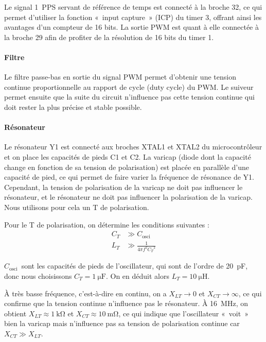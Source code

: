 \documentclass[12pt, a4paper, titlepage]{article}
\newcommand{\LT}{\ensuremath{L_T}}
\newcommand{\CT}{\ensuremath{C_T}}
\newcommand{\Cosci}{\ensuremath{C_{\text{osci}}}}
\newcommand{\XLT}{\ensuremath{X_{LT}}}
\newcommand{\XCT}{\ensuremath{X_{CT}}}
\begin{document}
Le signal \SI{1}{PPS} servant de référence de temps est connecté à la broche 32, ce qui permet d'utiliser la fonction «~input capture~» (ICP) du timer 3, offrant ainsi les avantages d'un compteur de 16 bits. La sortie PWM est quant à elle connectée à la broche 29 afin de profiter de la résolution de 16 bits du timer 1.

\paragraph{Filtre}

Le filtre passe-bas en sortie du signal PWM permet d'obtenir une tension continue proportionnelle au rapport de cycle (duty cycle) du PWM. Le suiveur permet ensuite que la suite du circuit n'influence pas cette tension continue qui doit rester la plus précise et stable possible.

\paragraph{Résonateur}

Le résonateur Y1 est connecté aux broches XTAL1 et XTAL2 du microcontrôleur et on place les capacités de pieds C1 et C2. La varicap (diode dont la capacité change en fonction de sa tension de polarisation) est placée en parallèle d'une capacité de pied, ce qui permet de faire varier la fréquence de résonance de Y1. Cependant, la tension de polarisation de la varicap ne doit pas influencer le résonateur, et le résonateur ne doit pas influencer la polarisation de la varicap. Nous utilisons pour cela un T de polarisation.

\bigskip

Pour le T de polarisation, on détermine les conditions suivantes : \nopagebreak
\begin{align*}
    \CT & \gg \Cosci \\
    \LT & \gg \frac{1}{4 \pi f^2 \CT^2}
\end{align*}

\Cosci\ sont les capacités de pieds de l'oscillateur, qui sont de l'ordre de \SI{20}{\pico\farad}, donc nous choisissons $\boxed{\CT = \SI{1}{\micro\farad}}$. On en déduit alors $\boxed{\LT = \SI{10}{\micro\henry}}$.

À très basse fréquence, c'est-à-dire en continu, on a $\XLT \to 0$ et $\XCT \to \infty$, ce qui confirme que la tension continue n'influence pas le résonateur. À \SI{16}{\mega\hertz}, on obtient $\XLT \approx \SI{1}{\kilo\ohm}$ et $\XCT \approx \SI{10}{\milli\ohm}$, ce qui indique que l'oscillateur «~voit~» bien la varicap mais n'influence pas sa tension de polarisation continue car $\XCT \gg \XLT$.
\end{document}
